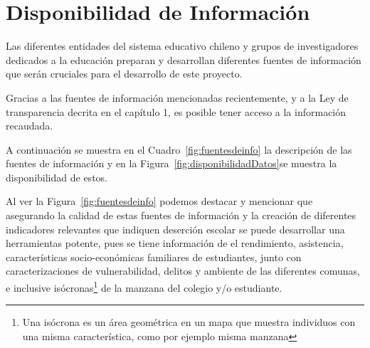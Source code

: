 \section{Disponibilidad de Información}
Las diferentes entidades del sistema educativo chileno y grupos de investigadores dedicados a la educación preparan y desarrollan diferentes fuentes de información que serán cruciales para el desarrollo de este proyecto.

Gracias a las fuentes de información mencionadas recientemente, y a la Ley de transparencia decrita en el capítulo 1, es posible tener acceso a la información recaudada.

A continuación se muestra en el Cuadro~\ref{fig:fuentesdeinfo} la descripción de las fuentes de información y en la Figura~\ref{fig:disponibilidadDatos}se muestra la disponibilidad de estos.

Al ver la Figura~\ref{fig:fuentesdeinfo} podemos destacar y mencionar que asegurando la calidad de estas fuentes de información y la creación de diferentes indicadores relevantes que indiquen deserción escolar se puede desarrollar una herramientas potente, pues se tiene información de el rendimiento, asistencia, características socio-económicas familiares de estudiantes, junto con caracterizaciones de vulnerabilidad, delitos y ambiente de las diferentes comunas, e inclusive isócronas\footnote{Una isócrona es un área geométrica en un mapa que muestra individuos con una misma característica, como por ejemplo misma manzana} de la manzana del colegio y/o estudiante.

